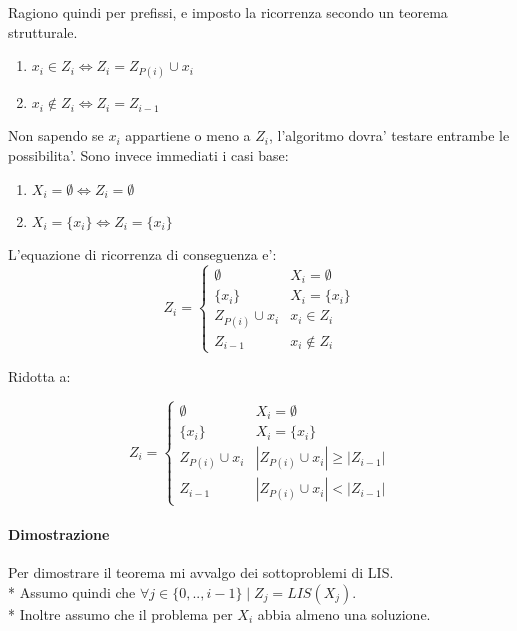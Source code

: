 Ragiono quindi per prefissi, e imposto la ricorrenza secondo un teorema strutturale. \\

\begin{enumerate}
    \item $x_i \in Z_i \Leftrightarrow Z_i = Z_{P(i)} \cup x_i$
    \item $x_i \notin Z_i \Leftrightarrow Z_i = Z_{i-1}$
\end{enumerate}

Non sapendo se $x_i$ appartiene o meno a $Z_i$, l'algoritmo dovra' testare entrambe le possibilita'.
Sono invece immediati i casi base:

\begin{enumerate}
    \item $X_i = \emptyset \Leftrightarrow Z_i = \emptyset$
    \item $X_i = \{x_i\} \Leftrightarrow Z_i = \{x_i\}$
\end{enumerate}

L'equazione di ricorrenza di conseguenza e':
\[
    Z_i =
    \begin{cases}
        \text{$\emptyset$} & \text{$X_i = \emptyset$} \\
        \text{$\{x_i\}$} & \text{$X_i = \{x_i\}$} \\
        \text{$Z_{P(i)} \cup x_i$} & \text{$x_i \in Z_i$} \\
        \text{$Z_{i-1}$} & \text{$x_i \notin Z_i$}
    \end{cases}
\]

Ridotta a:

\[
    Z_i =
    \begin{cases}
        \text{$\emptyset$} & \text{$X_i = \emptyset$} \\
        \text{$\{x_i\}$} & \text{$X_i = \{x_i\}$} \\
        \text{$Z_{P(i)} \cup x_i$} & \text{$|Z_{P(i)} \cup x_i| \geq |Z_{i-1}|$} \\
        \text{$Z_{i-1}$} & \text{$|Z_{P(i)} \cup x_i|< |Z_{i-1}|$}
    \end{cases}
\]

\paragraph{Dimostrazione}

Per dimostrare il teorema mi avvalgo dei sottoproblemi di LIS. \\*
Assumo quindi che $\forall j \in \{0,..,i-1\} \mid Z_j = LIS(X_j)$. \\*
Inoltre assumo che il problema per $X_i$ abbia almeno una soluzione.

